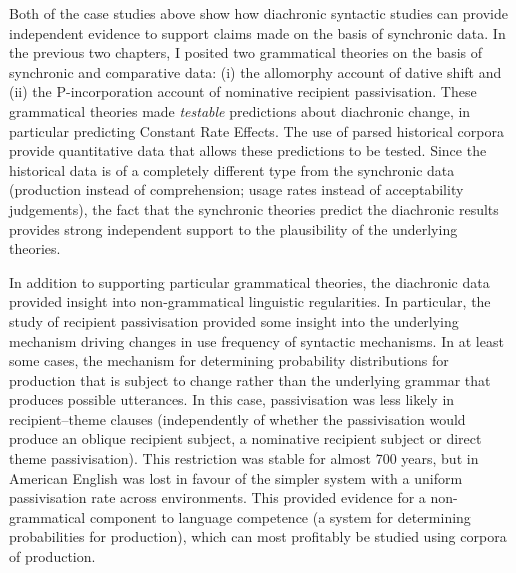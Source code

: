	Both of the case studies above show how diachronic syntactic studies can provide independent evidence to support claims made on the basis of synchronic data. In the previous two chapters, I posited two grammatical theories on the basis of synchronic and comparative data: (i) the allomorphy account of dative shift and (ii) the P-incorporation account of nominative recipient passivisation. These grammatical theories made \textit{testable} predictions about diachronic change, in particular predicting Constant Rate Effects. The use of parsed historical corpora provide quantitative data that allows these predictions to be tested. Since the historical data is of a completely different type from the synchronic data (production instead of comprehension; usage rates instead of acceptability judgements), the fact that the synchronic theories predict the diachronic results provides strong independent support to the plausibility of the underlying theories.

	In addition to supporting particular grammatical theories, the diachronic data provided insight into non-grammatical linguistic regularities. In particular, the study of recipient passivisation provided some insight into the underlying mechanism driving changes in use frequency of syntactic mechanisms. In at least some cases, the mechanism for determining probability distributions for production that is subject to change rather than the underlying grammar that produces possible utterances. In this case, passivisation was less likely in recipient--theme clauses (independently of whether the passivisation would produce an oblique recipient subject, a nominative recipient subject or direct theme passivisation). This restriction was stable for almost 700 years, but in American English was lost in favour of the simpler system with a uniform passivisation rate across environments. This provided evidence for a non-grammatical component to language competence (a system for determining probabilities for production), which can most profitably be studied using corpora of production.
%

